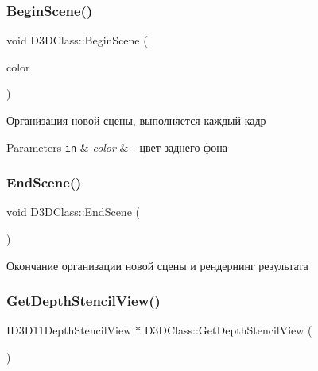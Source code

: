 \subsubsection{\texorpdfstring{Begin\+Scene()}{BeginScene()}}
{\footnotesize\ttfamily void D3\+D\+Class\+::\+Begin\+Scene (\begin{DoxyParamCaption}\item[{D3\+D\+X\+V\+E\+C\+T\+O\+R4}]{color }\end{DoxyParamCaption})}



Организация новой сцены, выполняется каждый кадр 


\begin{DoxyParams}[1]{Parameters}
\mbox{\tt in}  & {\em color} & -\/ цвет заднего фона \\
\hline
\end{DoxyParams}
\mbox{\label{class_d3_d_class_a53240832687367286a27b31c5f47e63d}} 
\subsubsection{\texorpdfstring{End\+Scene()}{EndScene()}}
{\footnotesize\ttfamily void D3\+D\+Class\+::\+End\+Scene (\begin{DoxyParamCaption}{ }\end{DoxyParamCaption})}



Окончание организации новой сцены и рендернинг результата 

\mbox{\label{class_d3_d_class_a4ed06b1e5f3e83fc73fccbd7a37ccded}} 
\subsubsection{\texorpdfstring{Get\+Depth\+Stencil\+View()}{GetDepthStencilView()}}
{\footnotesize\ttfamily I\+D3\+D11\+Depth\+Stencil\+View $\ast$ D3\+D\+Class\+::\+Get\+Depth\+Stencil\+View (\begin{DoxyParamCaption}{ }\end{DoxyParamCaption})}



